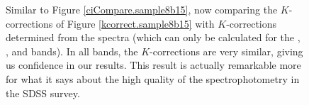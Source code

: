\clearpage
{}
\begin{figure}
\figurenum{\fignum}
\caption{\label{specK} Similar to Figure \ref{ciCompare.sample8b15},
now comparing the $K$-corrections of Figure \ref{kcorrect.sample8b15}
with $K$-corrections determined from the spectra (which can only be
calculated for the , , and 
bands). In all bands, the $K$-corrections are very similar, giving us
confidence in our results. This result is actually remarkable more for
what it says about the high quality of the spectrophotometry in the
SDSS survey.}
\end{figure}

\clearpage
{}
\begin{figure}
\figurenum{\fignum}
\caption{\label{aperturevsz.M.sample8b15} }
\end{figure}

